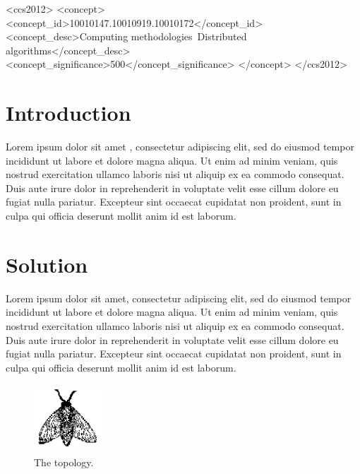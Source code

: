 \documentclass{sig-alternate-05-2015}
\begin{document}
\begin{CCSXML}
<ccs2012>
	<concept>
		<concept_id>10010147.10010919.10010172</concept_id>
		<concept_desc>Computing methodologies~Distributed algorithms</concept_desc>
		<concept_significance>500</concept_significance>
	</concept>
</ccs2012>
\end{CCSXML}

\printccsdesc


\section{Introduction}
Lorem ipsum dolor sit amet \cite{bowman:reasoning,braams:babel,clark:pct}, consectetur adipiscing elit, sed do eiusmod tempor incididunt ut labore et dolore magna aliqua. Ut enim ad minim veniam, quis nostrud exercitation ullamco laboris nisi ut aliquip ex ea commodo consequat. Duis aute irure dolor in reprehenderit in voluptate velit esse cillum dolore eu fugiat nulla pariatur. Excepteur sint occaecat cupidatat non proident, sunt in culpa qui officia deserunt mollit anim id est laborum.

\section{Solution}
Lorem ipsum dolor sit amet, consectetur adipiscing elit, sed do eiusmod tempor incididunt ut labore et dolore magna aliqua. Ut enim ad minim veniam, quis nostrud exercitation ullamco laboris nisi ut aliquip ex ea commodo consequat. Duis aute irure dolor in reprehenderit in voluptate velit esse cillum dolore eu fugiat nulla pariatur. Excepteur sint occaecat cupidatat non proident, sunt in culpa qui officia deserunt mollit anim id est laborum.

\begin{figure}
	\centering
	\includegraphics[height=1in, width=1in]{figures/fly}
	\caption{The topology.}
\end{figure}
\end{document}
